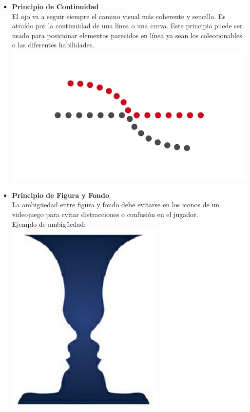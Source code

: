 \begin{itemize}
\item \textbf{Principio de Continuidad} \\
El ojo va a seguir siempre el camino visual más coherente y sencillo. Es atraído por la continuidad de una línea o una curva. Este principio puede ser usado para posicionar elementos parecidos en línea ya sean los coleccionables o las diferentes habilidades.\\
\includegraphics[width=\textwidth]{Imagenes/EjemploContinuidad.png}

\item \textbf{Principio de Figura y Fondo} \\
La ambigüedad entre figura y fondo debe evitarse en los iconos de un videojuego para evitar distracciones o confusión en el jugador.\\
Ejemplo de ambigüedad:\\
\includegraphics[scale=0.4]{Imagenes/EjemploFiguraFondo.png}


\end{itemize}
